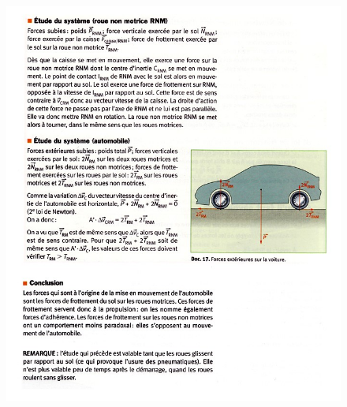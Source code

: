 \documentclass[11pt,a4paper]{article}
\begin{document}
\begin{figure}[h]
    \centering
    \includegraphics[width=\textwidth]{imgs/p2/xo1b.jpg}
\end{figure}
\end{document}
